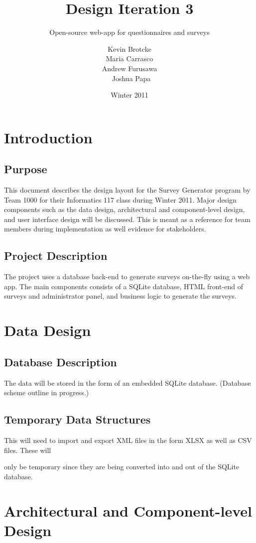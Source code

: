 \documentclass[a4paper,12pt,oneside]{report}
\title{Design Iteration 3}
\subtitle{Open-source web-app for questionnaires and surveys}
\date{Winter 2011}
\author{Kevin Brotcke\\
Maria Carrasco\\
Andrew Furusawa\\\
Joshua Papa }
\begin{document}
   
\renewcommand{\contentsname}{Contents}
\renewcommand{\bibname}{Bibliography}
\renewcommand{\caption}{{\bf Caption : }}

\raskolnikovmaketitle
\tableofcontents

\chapter{Introduction}

\section{ Purpose}

This document describes the design layout for the Survey Generator program by Team 1000 for their Informatics 117 class during Winter 2011. Major design components such as the data design, architectural and component-level design, and user interface design will be discussed. This is meant as a reference for team members during implementation as well evidence for stakeholders.
\section{ Project Description}

        The project uses a database back-end to generate surveys on-the-fly using a web app. The main components consists of a SQLite database, HTML front-end of surveys and administrator panel, and business logic to generate the surveys.
\chapter{ Data Design}
\section{ Database Description}

        The data will be stored in the form of an embedded SQLite database. (Database scheme outline in progress.)
\section{ Temporary Data Structures}

This will need to import and export XML files in the form XLSX as well as CSV files. These will

only be temporary since they are being converted into and out of the SQLite database.
\chapter{ Architectural and Component-level Design}
\end{document}
